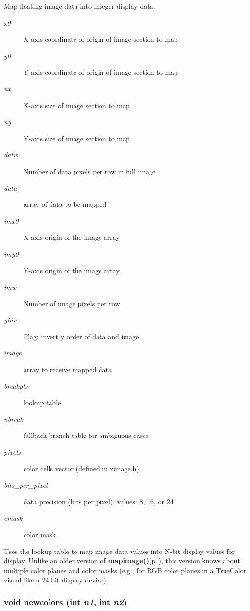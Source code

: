 Map floating image data into integer display data. 

\begin{Desc}
\item[Parameters:]
\begin{description}
\item[{\em x0}]X-axis coordinate of origin of image section to map \item[{\em y0}]Y-axis coordinate of origin of image section to map \item[{\em nx}]X-axis size of image section to map \item[{\em ny}]Y-axis size of image section to map \item[{\em datw}]Number of data pixels per row in full image \item[{\em data}]array of data to be mapped \item[{\em imx0}]X-axis origin of the image array \item[{\em imy0}]Y-axis origin of the image array \item[{\em imw}]Number of image pixels per row \item[{\em yinv}]Flag: invert y order of data and image \item[{\em image}]array to receive mapped data \item[{\em breakpts}]lookup table \item[{\em nbreak}]fallback branch table for ambiguous cases \item[{\em pixels}]color cells vector (defined in zimage.h) \item[{\em bits\_\-per\_\-pixel}]data precision (bits per pixel), values: 8, 16, or 24 \item[{\em cmask}]color mask\end{description}
\end{Desc}
Uses the lookup table to map image data values into N-bit display values for display. Unlike an older version of {\bf mapimage()}{\rm (p.\,\pageref{xtv_8h_a119})}, this version knows about multiple color planes and color masks (e.g., for RGB color planes in a True\-Color visual like a 24-bit display device). 
\subsubsection{\setlength{\rightskip}{0pt plus 5cm}void newcolors (int {\em n1}, int {\em n2})}\label{xtvutils_8c_a201}


